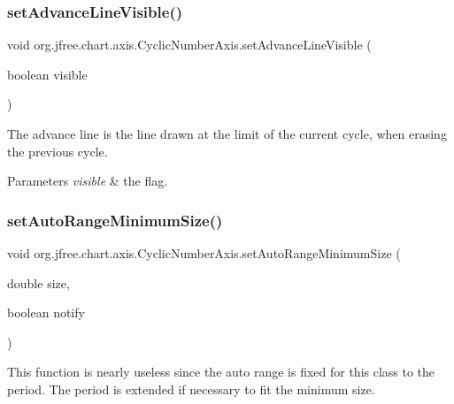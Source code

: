 \subsubsection{\texorpdfstring{set\+Advance\+Line\+Visible()}{setAdvanceLineVisible()}}
{\footnotesize\ttfamily void org.\+jfree.\+chart.\+axis.\+Cyclic\+Number\+Axis.\+set\+Advance\+Line\+Visible (\begin{DoxyParamCaption}\item[{boolean}]{visible }\end{DoxyParamCaption})}

The advance line is the line drawn at the limit of the current cycle, when erasing the previous cycle.


\begin{DoxyParams}{Parameters}
{\em visible} & the flag. \\
\hline
\end{DoxyParams}
\mbox{\label{classorg_1_1jfree_1_1chart_1_1axis_1_1_cyclic_number_axis_ac5f8722487b8bf7273414f0e2e43f34f}} 
\subsubsection{\texorpdfstring{set\+Auto\+Range\+Minimum\+Size()}{setAutoRangeMinimumSize()}}
{\footnotesize\ttfamily void org.\+jfree.\+chart.\+axis.\+Cyclic\+Number\+Axis.\+set\+Auto\+Range\+Minimum\+Size (\begin{DoxyParamCaption}\item[{double}]{size,  }\item[{boolean}]{notify }\end{DoxyParamCaption})}

This function is nearly useless since the auto range is fixed for this class to the period. The period is extended if necessary to fit the minimum size.


